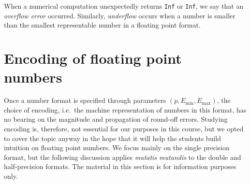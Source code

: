 When a numerical computation unexpectedly returns \texttt{Inf} or \texttt{Inf},
we say that an \emph{overflow error} occurred.
Similarly, \emph{underflow} occurs when a number
is smaller than the smallest representable number in a floating point format.


\section{Encoding of floating point numbers~\moreinfo}%
\label{sec:encoding_of_floating_point_numbers}

Once a number format is specified through parameters $(p, E_{\min}, E_{\max})$,
the choice of encoding,
i.e.\ the machine representation of numbers in this format,
has no bearing on the magnitude and propagation of round-off errors.
Studying encoding is, therefore, not essential for our purposes in this course,
but we opted to cover the topic anyway in the hope that it will help the students build intuition on floating point numbers.
We focus mainly on the single precision format,
but the following discussion applies \emph{mutatis mutandis} to the double and half-precision formats.
The material in this section is for information purposes only.

